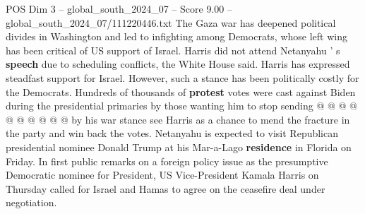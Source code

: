 \begin{textsample}{POS Dim 3 – global\_south\_2024\_07 – Score 9.00 – global\_south\_2024\_07/111220446.txt}
The Gaza war has deepened political divides in Washington and led to infighting among Democrats, whose left wing has been critical of US support of Israel.
Harris did not attend Netanyahu ' s \textbf{speech} due to scheduling conflicts, the White House said.
Harris has expressed steadfast support for Israel.
However, such a stance has been politically costly for the Democrats.
Hundreds of thousands of \textbf{protest} votes were cast against Biden during the presidential primaries by those wanting him to stop sending @ @ @ @ @ @ @ @ @ @ by his war stance see Harris as a chance to mend the fracture in the party and win back the votes.
Netanyahu is expected to visit Republican presidential nominee Donald Trump at his Mar-a-Lago \textbf{residence} in Florida on Friday.
In first public remarks on a foreign policy issue as the presumptive Democratic nominee for President, US Vice-President Kamala Harris on Thursday called for Israel and Hamas to agree on the ceasefire deal under negotiation.

\end{textsample}
